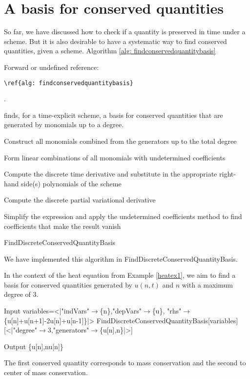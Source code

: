 \documentclass[runningheads]{llncs}
\newcommand{\1}{\chi}
\begin{document}
\section{A basis for conserved quantities}
\label{bfcq}
So far, we have discussed how to check if a quantity is preserved in time under a scheme. But it is also desirable to have a systematic way to find conserved quantities, given a scheme.
Algorithm \ref{alg: findconservedquantitybasis}
 {\color{red} Forward or undefined reference: \begin{verbatim}\ref{alg: findconservedquantitybasis}\end{verbatim}.}
 finds, for a time-explicit scheme, a basis for conserved quantities that are generated by monomials up to a degree. 
\begin{algorithm}
	\DontPrintSemicolon
	
	\label{fstep1} Construct all monomials combined from the {\sc generators} up to the total {\sc degree}\;
	
	\label{fstep2} Form linear combinations of all monomials with undetermined coefficients\:
	
	\label{fstep3} Compute the discrete time derivative and substitute in the appropriate right-hand side(s) polynomials of the scheme\;
	
	Compute the discrete partial variational derivative\;
	
	\label{fstep4} Simplify the expression and apply the undetermined coefficients method to find coefficients that make the result vanish\;
	
	\caption{{\sc FindDiscreteConservedQuantityBasis}}
	\label{alg: findconservedquantitybasis}
\end{algorithm}
We have implemented this algorithm in {\sc FindDiscreteConservedQuantityBasis}.
\begin{example}
In the context of the heat equation from Example \ref{heatex1}, we aim to find a basis for conserved quantities generated by \(u(n,t)\) and \(n\) with a maximum degree of 3.
	
	\begin{small}
		\begin{mmaCell}[moredefined={variables, FindDiscreteConservedQuantityBasis}]{Input}
  variables=<|"indVars"\(\pmb{\to}\)\{n\},"depVars"\(\pmb{\to}\)\{u\},
  "rhs"\(\pmb{\to}\)\{u[n]+u[n+1]-2u[n]+u[n-1]\}|>
  FindDiscreteConservedQuantityBasis[variables]
  [<|"degree"\(\pmb{\to}\)3,"generators"\(\pmb{\to}\)\{u[n],n\}|>]
  
\end{mmaCell}
		\begin{mmaCell}{Output}
  \{u[n],nu[n]\}
\end{mmaCell}
	\end{small}
The first conserved quantity corresponds to mass conservation and the second to center of mass conservation. 
\end{example}
\end{document}
